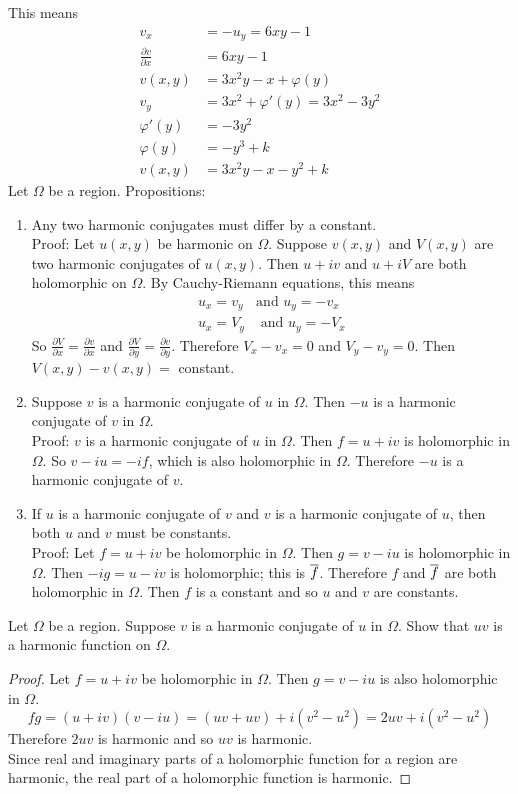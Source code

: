 \documentclass[12pt]{article}
\begin{document}
This means $$ \begin{aligned} v_x &= -u_y = 6xy - 1 \\ \frac{\partial v}{\partial x} &= 6xy - 1 \\ v(x,y) &= 3x^2y - x + \varphi(y) \\ v_y &= 3x^2 + \varphi'(y) = 3x^2 - 3y^2 \\ \varphi'(y) &= -3y^2 \\ \varphi(y) &= -y^3 + k \\ v(x,y) &= 3x^2y - x - y^2 + k \end{aligned} $$ 
Let $\Omega$ be a region. Propositions: \begin{enumerate} 
\item Any two harmonic conjugates must differ by a constant. \\
Proof: Let $u(x,y)$ be harmonic on $\Omega$. Suppose $v(x,y)$ and $V(x,y)$ are two harmonic conjugates of $u(x,y)$. Then $u+iv$ and $u+iV$ are both holomorphic on $\Omega$. By Cauchy-Riemann equations, this means $$ \begin{aligned} u_x = v_y &\text{and } u_y = -v_x \\ u_x = V_y &\text{ and } u_y = -V_x \end{aligned} $$ 
So $\frac{\partial V}{\partial x} = \frac{\partial v}{\partial x}$ and $\frac{\partial V}{\partial y} = \frac{\partial v}{\partial y}$. Therefore $V_x - v_x = 0$ and $V_y - v_y = 0$. Then $V(x,y) - v(x,y) = $ constant. 
\item Suppose $v$ is a harmonic conjugate of $u$ in $\Omega$. Then $-u$ is a harmonic conjugate of $v$ in $\Omega$. \\
Proof: $v$ is a harmonic conjugate of $u$ in $\Omega$. Then $f=u+iv$ is holomorphic in $\Omega$. So $v - iu = -if$, which is also holomorphic in $\Omega$. Therefore $-u$ is a harmonic conjugate of $v$. 
\item If $u$ is a harmonic conjugate of $v$ and $v$ is a harmonic conjugate of $u$, then both $u$ and $v$ must be constants. \\ 
Proof: Let $f=u+iv$ be holomorphic in $\Omega$. Then $g = v-iu$ is holomorphic in $\Omega$. Then $-ig = u - iv$ is holomorphic; this is $\overline{f}$. Therefore $f$ and $\overline{f}$ are both holomorphic in $\Omega$. Then $f$ is a constant and so $u$ and $v$ are constants. \end{enumerate} 
Let $\Omega$ be a region. Suppose $v$ is a harmonic conjugate of $u$ in $\Omega$. Show that $uv$ is a harmonic function on $\Omega$. 
\begin{proof} Let $f=u+iv$ be holomorphic in $\Omega$. Then $g = v - iu$ is also holomorphic in $\Omega$. $$ fg = (u + iv)(v -iu) = (uv + uv) + i(v^2 - u^2) = 2uv + i(v^2 - u^2) $$ Therefore $2uv$ is harmonic and so $uv$ is harmonic.\\ Since real and imaginary parts of a holomorphic function for a region are harmonic, the real part of a holomorphic function is harmonic.  \end{proof} 
\end{document}
